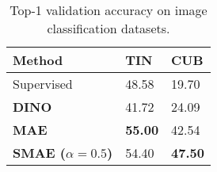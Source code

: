 



\begin{table}[!ht]
    \centering
    \def\arraystretch{1.1}
    \noindent\begin{tabularx}{0.7\columnwidth}{ XYY }
        \toprule
        Method & TIN  & CUB \\ \midrule
{Supervised}     & 48.58      & 19.70    \\
\textbf{DINO}           & 41.72   & 24.09      \\
\textbf{MAE}            & \textbf{55.00}       & 42.54     \\
\textbf{SMAE ($\alpha=0.5$)} & 54.40 & \textbf{47.50} \\ \bottomrule
    \end{tabularx}
    \caption{Top-1 validation accuracy on image classification datasets.}
        \label{tab:results}
\end{table}